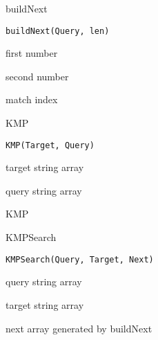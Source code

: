 \documentclass[a4paper]{book}
\begin{document}
%
\begin{Description}
buildNext
\end{Description}
%
\begin{Usage}
\begin{verbatim}
buildNext(Query, len)
\end{verbatim}
\end{Usage}
%
\begin{Arguments}
\begin{ldescription}
\item[\code{Query}] first number

\item[\code{len}] second number
\end{ldescription}
\end{Arguments}
%
\begin{Value}
match index
\end{Value}
%
\begin{Description}
KMP
\end{Description}
%
\begin{Usage}
\begin{verbatim}
KMP(Target, Query)
\end{verbatim}
\end{Usage}
%
\begin{Arguments}
\begin{ldescription}
\item[\code{Target}] target string array

\item[\code{Query}] query string array
\end{ldescription}
\end{Arguments}
%
\begin{Value}
KMP
\end{Value}
%
\begin{Description}
KMPSearch
\end{Description}
%
\begin{Usage}
\begin{verbatim}
KMPSearch(Query, Target, Next)
\end{verbatim}
\end{Usage}
%
\begin{Arguments}
\begin{ldescription}
\item[\code{Query}] query string array

\item[\code{Target}] target string array

\item[\code{Next}] next array generated by buildNext
\end{ldescription}
\end{Arguments}
\end{document}
